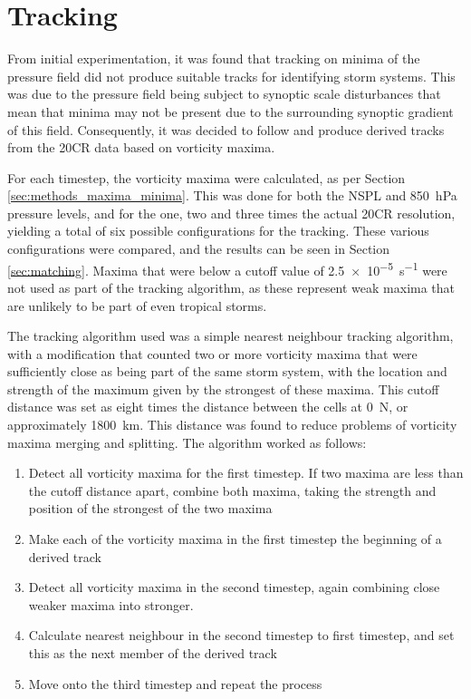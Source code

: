 \documentclass[pdftex,12pt,a4paper]{report}
\begin{document}
\section{Tracking}
\label{sec:tracking}

From initial experimentation, it was found that tracking on minima of the pressure field did not
produce suitable tracks for identifying storm systems. This was due to the pressure field being
subject to synoptic scale disturbances that mean that minima may not be present due to the
surrounding synoptic gradient of this field. Consequently, it was decided to follow
\textcite{reed1988evaluation, thorncroft2001african} and produce derived tracks from the 20CR data
based on vorticity maxima.

For each timestep, the vorticity maxima were calculated, as per Section
\ref{sec:methods_maxima_minima}. This was done for both the NSPL and \SI{850}{hPa} pressure
levels, and for the one, two and three times the actual 20CR resolution, yielding a total of six
possible configurations for the tracking. These various configurations were compared, and the
results can be seen in Section \ref{sec:matching}. Maxima that were below a cutoff value
of \SI{2.5e-5}{s^{-1}} were not used as part of the tracking algorithm, as these represent weak maxima
that are unlikely to be part of even tropical storms. 


The tracking algorithm used was a simple nearest neighbour tracking algorithm, with a modification
that counted two or more vorticity maxima that were sufficiently close as being part of the same storm
system, with the location and strength of the maximum given by the strongest of
these maxima. This cutoff distance was set as eight times the distance between the cells at
0\textdegree\ N, or approximately \SI{1800}{km}. This distance was found to reduce problems of
vorticity maxima merging and splitting. The algorithm worked as follows:

\begin{enumerate}
    \item Detect all vorticity maxima for the first timestep. If two maxima are less than the cutoff
        distance apart, combine both maxima, taking the strength and position of the strongest of
        the two maxima
    \item Make each of the vorticity maxima in the first timestep the beginning of a derived track
    \item Detect all vorticity maxima in the second timestep, again combining close weaker maxima
        into stronger. 
    \item Calculate nearest neighbour in the second timestep to first timestep, and set this as the
        next member of the derived track
    \item Move onto the third timestep and repeat the process
\end{enumerate}
\end{document}
